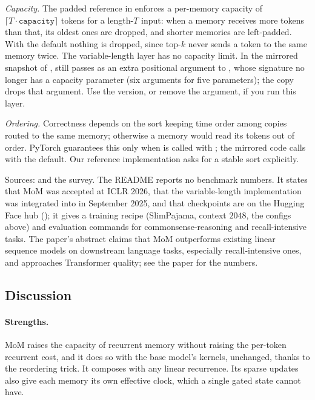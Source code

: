 \begin{pitfall}[title={Pitfall: capacity and ordering in the reorder step}]
\emph{Capacity.} The padded reference in
 enforces a
per-memory capacity of $\lceil T\cdot\mathtt{capacity}\rceil$ tokens for a length-$T$ input: when
a memory receives more tokens than that, its oldest ones are dropped, and shorter memories are
left-padded. With the default  nothing is dropped, since top-$k$ never
sends a token to the same memory twice. The variable-length layer has no capacity limit. In the mirrored snapshot of ,
 still passes  as an extra positional argument to
, whose signature no longer has a capacity parameter (six arguments for five
parameters); the \fla{} copy drops that argument. Use the \fla{} version, or remove the
argument, if you run this layer.

\emph{Ordering.} Correctness depends on the sort keeping time order among copies routed to
the same memory; otherwise a memory would read its tokens out of order. PyTorch guarantees
this only when  is called with ; the mirrored code calls
 with the default. Our reference implementation asks for a stable sort
explicitly.
\end{pitfall}

\begin{results}
Sources:  and the survey. The README reports
no benchmark numbers. It states that MoM was accepted at ICLR 2026, that the variable-length
implementation was integrated into \fla{} in September 2025, and that checkpoints are on the
Hugging Face hub (); it gives a training recipe (SlimPajama, context
$2048$, the configs above) and evaluation commands for commonsense-reasoning and
recall-intensive tasks. The paper's abstract claims that MoM outperforms existing linear
sequence models on downstream language tasks, especially recall-intensive ones, and
approaches Transformer quality; see the paper for the numbers.
\end{results}

\subsection{Discussion}

\paragraph{Strengths.} MoM raises the capacity of recurrent memory without raising the
per-token recurrent cost, and it does so with the base model's kernels, unchanged, thanks
to the reordering trick. It composes with any linear recurrence. Its sparse updates also give
each memory its own effective clock, which a single gated state cannot have.

